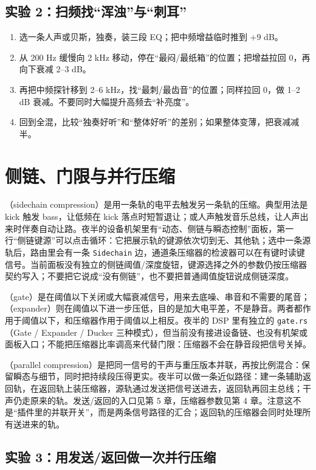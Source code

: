 \subsection{实验 2：扫频找“浑浊”与“刺耳”}

\begin{enumerate}
  \item 选一条人声或贝斯，独奏，装三段 EQ；把中频增益临时推到 $+9$ dB。
  \item 从 200 Hz 缓慢向 2 kHz 移动，停在“最闷/最纸箱”的位置；把增益拉回 0，再向下衰减 2–3 dB。
  \item 再把中频探针移到 2–6 kHz，找“最刺/最齿音”的位置；同样拉回 0，做 1–2 dB 衰减。不要同时大幅提升高频去“补亮度”。
  \item 回到全混，比较“独奏好听”和“整体好听”的差别；如果整体变薄，把衰减减半。
\end{enumerate}

\section{侧链、门限与并行压缩}

（sidechain compression）是用一条轨的电平去触发另一条轨的压缩。典型用法是 kick 触发 bass，让低频在 kick 落点时短暂退让；或人声触发音乐总线，让人声出来时伴奏自动让路。夜半的设备机架里有“动态、侧链与瞬态控制”面板，第一行“侧链键源”可以点击循环：它把展示轨的键源依次切到无、其他轨；选中一条源轨后，路由里会有一条 \texttt{Sidechain} 边，通道条压缩器的检波器可以在有键时读键信号。当前面板没有独立的侧链阈值/深度旋钮，键源选择之外的参数仍按压缩器契约写入；不要把它说成“没有侧链”，也不要把普通阈值旋钮说成侧链深度。

（gate）是在阈值以下关闭或大幅衰减信号，用来去底噪、串音和不需要的尾音；（expander）则在阈值以下进一步压低，目的是加大电平差，不是静音。两者都作用于阈值以下，和压缩器作用于阈值以上相反。夜半的 DSP 里有独立的 \texttt{gate.rs}（Gate / Expander / Ducker 三种模式），但当前没有接进设备链、也没有机架或面板入口；不能把压缩器比率调高来代替门限：压缩器不会在静音段把信号关掉。

（parallel compression）是把同一信号的干声与重压版本并联，再按比例混合：保留瞬态与细节，同时把持续段压得更实。夜半可以做一条近似路径：建一条辅助返回轨，在返回轨上装压缩器，源轨通过发送把信号送进去，返回轨再回主总线；干声仍走原来的轨。发送/返回的入口见第 5 章，压缩器参数见第 4 章。注意这不是“插件里的并联开关”，而是两条信号路径的汇合；返回轨的压缩器会同时处理所有送进来的轨。

\subsection{实验 3：用发送/返回做一次并行压缩}

